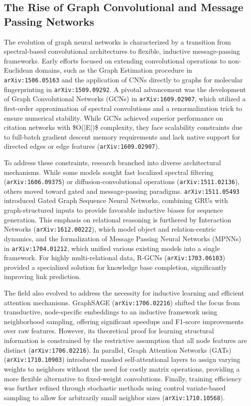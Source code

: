 \documentclass[11pt]{article}
\begin{document}
\subsection{The Rise of Graph Convolutional and Message Passing Networks}

The evolution of graph neural networks is characterized by a transition from spectral-based convolutional architectures to flexible, inductive message-passing frameworks. Early efforts focused on extending convolutional operations to non-Euclidean domains, such as the Graph Estimation procedure in \texttt{arXiv:1506.05163} and the application of CNNs directly to graphs for molecular fingerprinting in \texttt{arXiv:1509.09292}. A pivotal advancement was the development of Graph Convolutional Networks (GCNs) in \texttt{arXiv:1609.02907}, which utilized a first-order approximation of spectral convolutions and a renormalization trick to ensure numerical stability. While GCNs achieved superior performance on citation networks with \$O(|E|)\$ complexity, they face scalability constraints due to full-batch gradient descent memory requirements and lack native support for directed edges or edge features (\texttt{arXiv:1609.02907}).

To address these constraints, research branched into diverse architectural mechanisms. While some models sought fast localized spectral filtering (\texttt{arXiv:1606.09375}) or diffusion-convolutional operations (\texttt{arXiv:1511.02136}), others moved toward gated and message-passing paradigms. \texttt{arXiv:1511.05493} introduced Gated Graph Sequence Neural Networks, combining GRUs with graph-structured inputs to provide favorable inductive biases for sequence generation. This emphasis on relational reasoning is furthered by Interaction Networks (\texttt{arXiv:1612.00222}), which model object and relation-centric dynamics, and the formalization of Message Passing Neural Networks (MPNNs) in \texttt{arXiv:1704.01212}, which unified various existing models into a single framework. For highly multi-relational data, R-GCNs (\texttt{arXiv:1703.06103}) provided a specialized solution for knowledge base completion, significantly improving link prediction.

The field also evolved to address the necessity for inductive learning and efficient attention mechanisms. GraphSAGE (\texttt{arXiv:1706.02216}) shifted the focus from transductive, node-specific embeddings to an inductive framework using neighborhood sampling, offering significant speedups and F1-score improvements over raw features. However, its theoretical proof for learning structural information is constrained by the restrictive assumption that all node features are distinct (\texttt{arXiv:1706.02216}). In parallel, Graph Attention Networks (GATs) (\texttt{arXiv:1710.10903}) introduced masked self-attentional layers to assign varying weights to neighbors without the need for costly matrix operations, providing a more flexible alternative to fixed-weight convolutions. Finally, training efficiency was further refined through stochastic methods using control variate-based sampling to allow for arbitrarily small neighbor sizes (\texttt{arXiv:1710.10568}).
\end{document}
